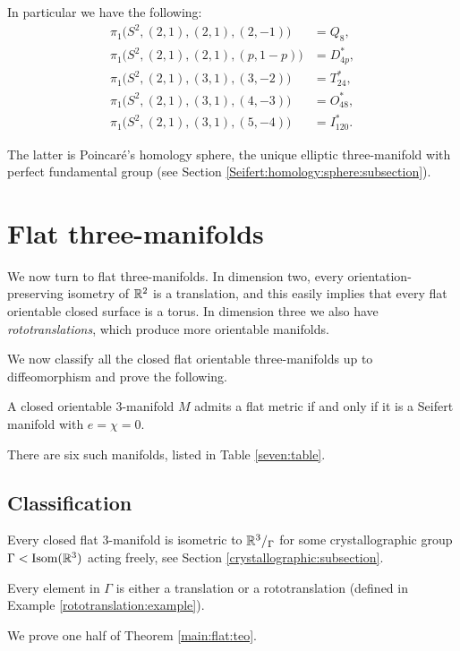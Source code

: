 In particular we have the following:
\begin{align*}
\pi_1\big(S^2,(2,1),(2,1),(2,-1)\big) & = Q_8, \\
\pi_1\big(S^2,(2,1),(2,1),(p,1-p)\big) & = D_{4p}^*, \\
\pi_1\big(S^2,(2,1),(3,1),(3,-2)\big) & = T_{24}^*, \\
\pi_1\big(S^2,(2,1),(3,1),(4,-3)\big) & = O_{48}^*, \\
\pi_1\big(S^2,(2,1),(3,1),(5,-4)\big) & = I_{120}^*. 
\end{align*}

The latter is Poincar\'e's homology sphere, the unique elliptic three-manifold with perfect fundamental group (see Section \ref{Seifert:homology:sphere:subsection}).

\section{Flat three-manifolds}
We now turn to flat three-manifolds. In dimension two, every orientation-preserving isometry of $\mathbb{R}^2$ is a translation, and this easily implies that every flat orientable closed surface is a torus. In dimension three we also have \emph{rototranslations}, which produce more orientable manifolds. 

We now classify all the closed flat orientable three-manifolds up to diffeomorphism and prove the following.
\begin{teo} \label{main:flat:teo}
A closed orientable 3-manifold $M$ admits a flat metric if and only if it is a Seifert manifold with $e=\chi=0$.
\end{teo}
There are six such manifolds, listed in Table \ref{seven:table}. 

\subsection{Classification}
Every closed flat 3-manifold is isometric to $\mathbb{R}^3/_\Gamma$ for some crystallographic group $\Gamma< {\rm Isom}(\mathbb{R}^3)$ acting freely, see Section \ref{crystallographic:subsection}.

\begin{ex}
Every element in $\Gamma$ is either a translation or a rototranslation (defined in Example \ref{rototranslation:example}).
\end{ex}

We prove one half of Theorem \ref{main:flat:teo}.

